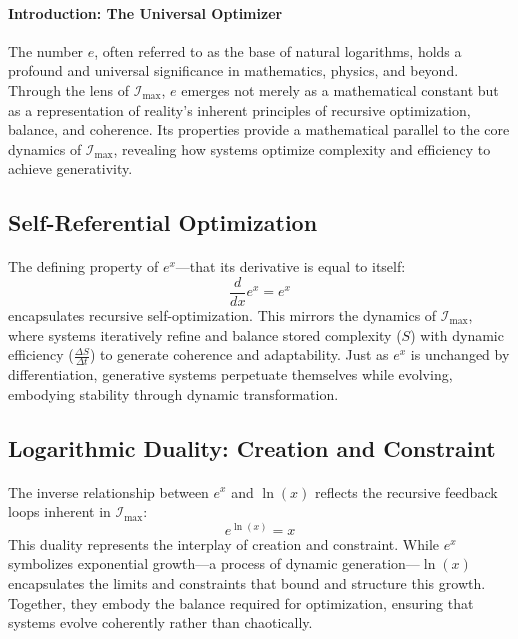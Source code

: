 \documentclass[12pt]{article}
\begin{document}
\paragraph{Introduction: The Universal Optimizer}
The number \(e\), often referred to as the base of natural logarithms, holds a profound and universal significance in mathematics, physics, and beyond. Through the lens of \(\mathcal{I}_{\text{max}}\), \(e\) emerges not merely as a mathematical constant but as a representation of reality's inherent principles of recursive optimization, balance, and coherence. Its properties provide a mathematical parallel to the core dynamics of \(\mathcal{I}_{\text{max}}\), revealing how systems optimize complexity and efficiency to achieve generativity.

\subsection{Self-Referential Optimization}
\paragraph{}
The defining property of \(e^x\)—that its derivative is equal to itself:
\[
\frac{d}{dx} e^x = e^x
\]
encapsulates recursive self-optimization. This mirrors the dynamics of \(\mathcal{I}_{\text{max}}\), where systems iteratively refine and balance stored complexity (\(S\)) with dynamic efficiency (\(\frac{\Delta S}{\Delta t}\)) to generate coherence and adaptability. Just as \(e^x\) is unchanged by differentiation, generative systems perpetuate themselves while evolving, embodying stability through dynamic transformation.

\subsection{Logarithmic Duality: Creation and Constraint}
\paragraph{}
The inverse relationship between \(e^x\) and \(\ln(x)\) reflects the recursive feedback loops inherent in \(\mathcal{I}_{\text{max}}\):
\[
e^{\ln(x)} = x
\]
This duality represents the interplay of creation and constraint. While \(e^x\) symbolizes exponential growth—a process of dynamic generation—\(\ln(x)\) encapsulates the limits and constraints that bound and structure this growth. Together, they embody the balance required for optimization, ensuring that systems evolve coherently rather than chaotically.
\end{document}
